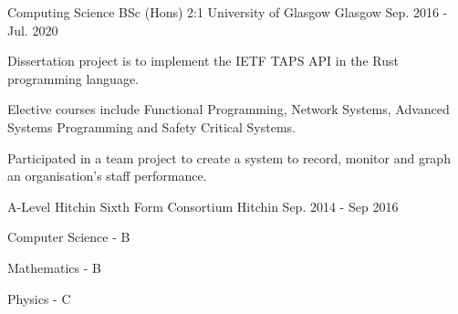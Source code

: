 

\begin{cventries}

  \cventry
	{Computing Science BSc (Hons) 2:1} %
    {University of Glasgow} %
    {Glasgow} %
    {Sep. 2016 - Jul. 2020} %
    {
      \begin{cvitems} %
        \item {Dissertation project is to implement the IETF TAPS API in the Rust programming language.}
	\item {Elective courses include Functional Programming, Network Systems, Advanced Systems Programming and Safety Critical Systems.}
	\item {Participated in a team project to create a system to record, monitor and graph an organisation's staff performance.}
      \end{cvitems}
    }
  \cventry
    {A-Level}
    {Hitchin Sixth Form Consortium}
    {Hitchin}
    {Sep. 2014 - Sep 2016}
    {
      \begin{cvitems}
        \item{Computer Science - B}
	\item{Mathematics - B}
	\item{Physics - C}
      \end{cvitems}
    }
\end{cventries}
